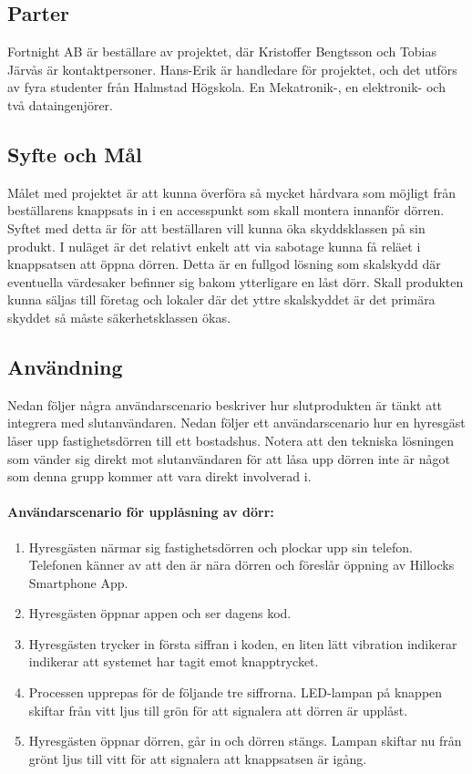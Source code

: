 \documentclass[twocolumn]{article}
\begin{document}
\subsection{Parter}
Fortnight AB är beställare av projektet, där Kristoffer Bengtsson och Tobias Järvås är kontaktpersoner. Hans-Erik är handledare för projektet, och det utförs av fyra studenter från Halmstad Högskola. En Mekatronik-, en elektronik- och två dataingenjörer.

\subsection{Syfte och Mål}
Målet med projektet är att kunna överföra så mycket hårdvara som möjligt från beställarens knappsats in i en accesspunkt som skall montera innanför dörren. Syftet med detta är för att beställaren vill kunna öka skyddsklassen på sin produkt. I nuläget är det relativt enkelt att via sabotage kunna få reläet i knappsatsen att öppna dörren. Detta är en fullgod lösning som skalskydd där eventuella värdesaker befinner sig bakom ytterligare en låst dörr. Skall produkten kunna säljas till företag och lokaler där det yttre skalskyddet är det primära skyddet så måste säkerhetsklassen ökas.

\subsection{Användning}
Nedan följer några användarscenario beskriver hur slutprodukten är tänkt att integrera med slutanvändaren. Nedan följer ett användarscenario hur en hyresgäst låser upp fastighetsdörren till ett bostadshus. Notera att den tekniska lösningen som vänder sig direkt mot slutanvändaren för att låsa upp dörren inte är något som denna grupp kommer att vara direkt involverad i.

\paragraph{Användarscenario för upplåsning av dörr:} 
\begin{enumerate}
    \item Hyresgästen närmar sig fastighetsdörren och plockar upp sin telefon. Telefonen känner av att den är nära dörren och föreslår öppning av Hillocks Smartphone App.
    \item Hyresgästen öppnar appen och ser dagens kod.
    \item Hyresgästen trycker in första siffran i koden, en liten lätt vibration indikerar indikerar att systemet har tagit emot knapptrycket.
    \item Processen upprepas för de följande tre siffrorna. LED-lampan på knappen skiftar från vitt ljus till grön för att signalera att dörren är upplåst. 
    \item Hyresgästen öppnar dörren, går in och dörren stängs. Lampan skiftar nu från grönt ljus till vitt för att signalera att knappsatsen är igång.
\end{enumerate}
\end{document}
